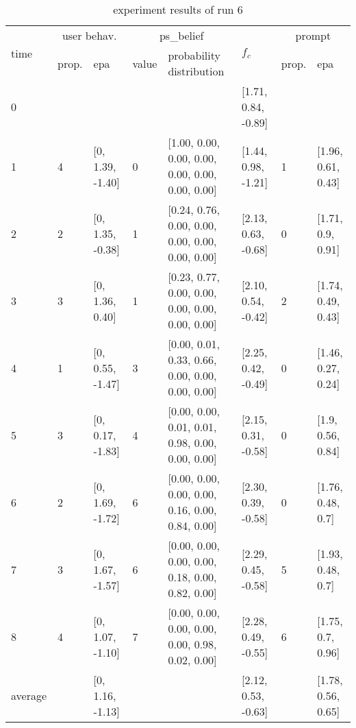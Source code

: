 \begin{table}[htbp]\footnotesize
\caption{experiment results of run 6}
\begin{tabular}{|p{0.4cm}|p{0.6cm}|l|p{0.6cm}|p{3.3cm}|l|p{0.6cm}|l|}
\hline

\multirow{2}{*}{time} & \multicolumn{2}{c|}{user behav.} & \multicolumn{2}{c|}{ps\_belief} &
\multirow{2}{*}{$f_c$} & \multicolumn{2}{c|}{prompt} \\ \cline{2-5}\cline{ 7- 8}
& prop. & epa & value & probability distribution &  & prop. & epa \\ \hline

0 & \multicolumn{1}{l|}{} &  & \multicolumn{1}{l|}{} &  & [1.71, 0.84, -0.89] & \multicolumn{1}{l|}{} &  \\ \hline
1 & 4 & [0, 1.39, -1.40] & 0 & [1.00, 0.00, 0.00, 0.00, 0.00, 0.00, 0.00, 0.00] & [1.44, 0.98, -1.21] & 1 & [1.96, 0.61, 0.43] \\ \hline
2 & 2 & [0, 1.35, -0.38] & 1 & [0.24, 0.76, 0.00, 0.00, 0.00, 0.00, 0.00, 0.00] & [2.13, 0.63, -0.68] & 0 & [1.71, 0.9, 0.91] \\ \hline
3 & 3 & [0, 1.36, 0.40] & 1 & [0.23, 0.77, 0.00, 0.00, 0.00, 0.00, 0.00, 0.00] & [2.10, 0.54, -0.42] & 2 & [1.74, 0.49, 0.43] \\ \hline
4 & 1 & [0, 0.55, -1.47] & 3 & [0.00, 0.01, 0.33, 0.66, 0.00, 0.00, 0.00, 0.00] & [2.25, 0.42, -0.49] & 0 & [1.46, 0.27, 0.24] \\ \hline
5 & 3 & [0, 0.17, -1.83] & 4 & [0.00, 0.00, 0.01, 0.01, 0.98, 0.00, 0.00, 0.00] & [2.15, 0.31, -0.58] & 0 & [1.9, 0.56, 0.84] \\ \hline
6 & 2 & [0, 1.69, -1.72] & 6 & [0.00, 0.00, 0.00, 0.00, 0.16, 0.00, 0.84, 0.00] & [2.30, 0.39, -0.58] & 0 & [1.76, 0.48, 0.7] \\ \hline
7 & 3 & [0, 1.67, -1.57] & 6 & [0.00, 0.00, 0.00, 0.00, 0.18, 0.00, 0.82, 0.00] & [2.29, 0.45, -0.58] & 5 & [1.93, 0.48, 0.7] \\ \hline
8 & 4 & [0, 1.07, -1.10] & 7 & [0.00, 0.00, 0.00, 0.00, 0.00, 0.98, 0.02, 0.00] & [2.28, 0.49, -0.55] & 6 & [1.75, 0.7, 0.96] \\ \hline
\multicolumn{1}{|l|}{average} & \multicolumn{1}{l|}{} & [0, 1.16, -1.13] & \multicolumn{1}{l|}{} &  & [2.12, 0.53, -0.63] & \multicolumn{1}{l|}{} & [1.78, 0.56, 0.65] \\ \hline
\end{tabular}
\label{}
\end{table}


